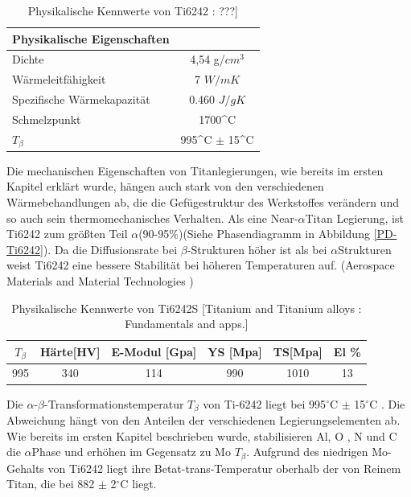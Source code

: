 \begin{table}[H]
	\centering	
	\begin{tabular}{l c}
		
		Physikalische Eigenschaften & \\
		\hline
		Dichte& 4,54 g/$cm^3$\\
		Wärmeleitfähigkeit & 7 $W/mK$ \\
		Spezifische Wärmekapazität & 0.460 $J/gK$\\
		Schmelzpunkt & 1700^\circ C \\
		$T_{\beta}$ &  995^\circ C $\pm$ 15^\circ C \\
		\hline
		
	\end{tabular}
	\caption{Physikalische Kennwerte von Ti6242 : ???]}
	\label{Phy.eig.}
\end{table}


Die mechanischen Eigenschaften von Titanlegierungen, wie bereits im ersten Kapitel erklärt wurde, hängen auch stark von den verschiedenen Wärmebehandlungen ab, die die Gefügestruktur des Werkstoffes  verändern und so auch sein thermomechanisches Verhalten.
Als eine Near-$\alpha$Titan Legierung, ist Ti6242 zum größten Teil $\alpha$(90-95\%)(Siehe Phasendiagramm in Abbildung \ref{PD-Ti6242}). Da die Diffusionsrate bei $\beta$-Strukturen höher ist als bei $\alpha$Strukturen weist Ti6242 eine bessere Stabilität bei höheren Temperaturen auf. (Aerospace Materials and Material Technologies ) 

\begin{table}[H]
	\centering	
	\begin{tabular}{|c| c| c| c| c| c|}										
		\hline
		$T_{\beta}$ & Härte[HV] & E-Modul [Gpa]& YS [Mpa]&TS[Mpa]& El \% \\
		\hline
		995&340&114&990&1010&13\\
		\hline
	\end{tabular}
	\caption{Physikalische Kennwerte von Ti6242S [Titanium and Titanium alloys  : Fundamentals and apps.]}
	\label{Mec.}
\end{table}

Die $\alpha$-$\beta$-Transformationstemperatur $T_{\beta}$ von Ti-6242 liegt bei 995$^\circ$C $\pm$ 15$^\circ$C . Die Abweichung hängt  von den Anteilen der verschiedenen Legierungselementen ab. Wie bereits im ersten Kapitel beschrieben wurde, stabilisieren  Al, O , N und C die $\alpha$Phase und erhöhen im Gegensatz zu Mo  {$T_{\beta}$}.
Aufgrund des niedrigen Mo-Gehalts von Ti6242 liegt ihre Betat-trans-Temperatur oberhalb der von Reinem Titan, die bei 882 $\pm$ 2$^\circ$C liegt.


